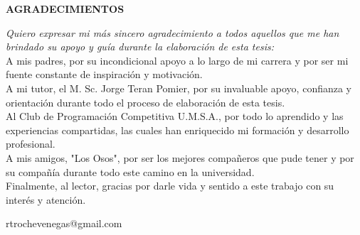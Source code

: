\clearpage



\begin{flushleft}
\begin{center}
  \textbf{AGRADECIMIENTOS}
\end{center}

\textit{Quiero expresar mi más sincero agradecimiento a todos aquellos que me han brindado su apoyo y guía durante la elaboración de esta tesis: }\\
A mis padres, por su incondicional apoyo a lo largo de mi carrera y por ser mi fuente constante de inspiración y motivación. \\

A mi tutor, el M. Sc. Jorge Teran Pomier, por su invaluable apoyo, confianza y orientación durante todo el proceso de elaboración de esta tesis. \\

Al Club de Programación Competitiva U.M.S.A., por todo lo aprendido y las experiencias compartidas, las cuales han enriquecido mi formación y desarrollo profesional. \\

A mis amigos, "Los Osos", por ser los mejores compañeros que pude tener y por su compañía durante todo este camino en la universidad. \\ 

Finalmente, al lector, gracias por darle vida y sentido a este trabajo con su interés y atención. \\
\end{flushleft}

\vspace{\fill}
\begin{flushright}
  rtrochevenegas@gmail.com
\end{flushright}
